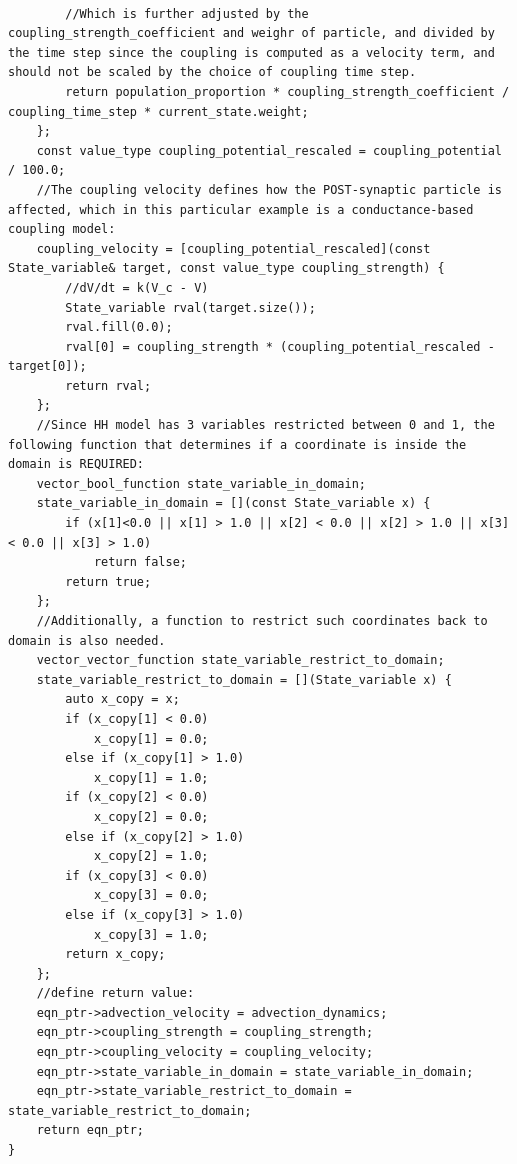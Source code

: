 \documentclass[10pt]{article} %
\begin{document}
\begin{lstlisting}
        
        //Which is further adjusted by the coupling_strength_coefficient and weighr of particle, and divided by the time step since the coupling is computed as a velocity term, and should not be scaled by the choice of coupling time step.
        return population_proportion * coupling_strength_coefficient / coupling_time_step * current_state.weight;
    };
    const value_type coupling_potential_rescaled = coupling_potential / 100.0;
    //The coupling velocity defines how the POST-synaptic particle is affected, which in this particular example is a conductance-based coupling model:
    coupling_velocity = [coupling_potential_rescaled](const State_variable& target, const value_type coupling_strength) {
        //dV/dt = k(V_c - V) 
        State_variable rval(target.size());
        rval.fill(0.0);
        rval[0] = coupling_strength * (coupling_potential_rescaled - target[0]);
        return rval;
    };
    //Since HH model has 3 variables restricted between 0 and 1, the following function that determines if a coordinate is inside the domain is REQUIRED:
    vector_bool_function state_variable_in_domain;
    state_variable_in_domain = [](const State_variable x) {
        if (x[1]<0.0 || x[1] > 1.0 || x[2] < 0.0 || x[2] > 1.0 || x[3] < 0.0 || x[3] > 1.0)
            return false;
        return true;
    };
    //Additionally, a function to restrict such coordinates back to domain is also needed.
    vector_vector_function state_variable_restrict_to_domain;
    state_variable_restrict_to_domain = [](State_variable x) {
        auto x_copy = x;
        if (x_copy[1] < 0.0)
            x_copy[1] = 0.0;
        else if (x_copy[1] > 1.0)
            x_copy[1] = 1.0;
        if (x_copy[2] < 0.0)
            x_copy[2] = 0.0;
        else if (x_copy[2] > 1.0)
            x_copy[2] = 1.0;
        if (x_copy[3] < 0.0)
            x_copy[3] = 0.0;
        else if (x_copy[3] > 1.0)
            x_copy[3] = 1.0;
        return x_copy;
    };
    //define return value:
    eqn_ptr->advection_velocity = advection_dynamics;
    eqn_ptr->coupling_strength = coupling_strength;
    eqn_ptr->coupling_velocity = coupling_velocity;
    eqn_ptr->state_variable_in_domain = state_variable_in_domain;
    eqn_ptr->state_variable_restrict_to_domain = state_variable_restrict_to_domain;
    return eqn_ptr;
}
\end{lstlisting} 
\end{document}

